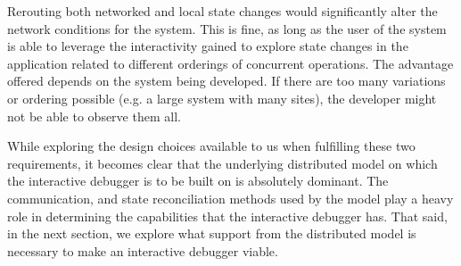 Rerouting both networked and local state changes would significantly alter the network conditions for the system. This is fine, as long as the user of the system is able to leverage the interactivity gained to explore state changes in the application related to different orderings of concurrent operations. The advantage offered depends on the system being developed. If there are too many variations or ordering possible (e.g. a large system with many sites), the developer might not be able to observe them all.

While exploring the design choices available to us when fulfilling these two requirements, it becomes clear that the underlying distributed model on which the interactive debugger is to be built on is absolutely dominant. The communication, and state reconciliation methods used by the model play a heavy role in determining the capabilities that the interactive debugger has. That said, in the next section, we explore what support from the distributed model is necessary to make an interactive debugger viable.